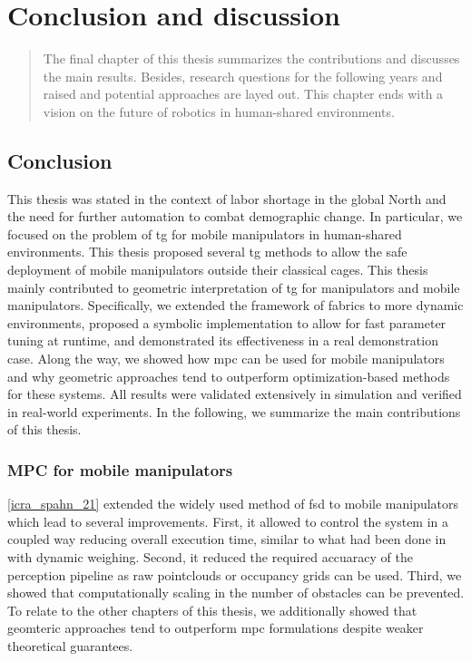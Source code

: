 \chapter{Conclusion and discussion}
\label{cha:conclusion_and_discussion}

\begin{abstract}
The final chapter of this thesis summarizes the contributions and discusses the
main results. Besides, research questions for the following years and raised and
potential approaches are layed out. This chapter ends with a vision on the
future of robotics in human-shared environments.
\end{abstract}

\newpage

\section{Conclusion}
\label{sec:conclusion}

This thesis was stated in the context of labor shortage in the global North and
the need for further automation to combat demographic change. In particular, we
focused on the problem of \ac{tg} for mobile manipulators in human-shared
environments. This thesis proposed several \ac{tg} methods to allow the safe
deployment of mobile manipulators outside their classical cages.
This thesis mainly contributed to geometric interpretation of \ac{tg} for
manipulators and mobile manipulators. Specifically, we extended the framework of
\ac{fabrics} to more dynamic environments, proposed a symbolic implementation to
allow for fast parameter tuning at runtime, and demonstrated its effectiveness
in a real demonstration case. Along the way, we showed how \ac{mpc} can be used
for mobile manipulators and why geometric approaches tend to outperform
optimization-based methods for these systems. All results were validated
extensively in simulation and verified in real-world experiments. In the
following, we summarize the main contributions of this thesis.

\subsection{MPC for mobile manipulators}
\label{sec:conclusion_mpc}

\cref{icra_spahn_21} extended the widely used method of \ac{fsd} to mobile
manipulators which lead to several improvements. First, it allowed to control
the system in a coupled way reducing overall execution time, similar to what had
been done in \cite{Avanzini2018} with dynamic weighing. Second, it reduced the
required accuaracy of the perception pipeline as raw pointclouds or occupancy
grids can be used. Third, we showed that computationally scaling in the number
of obstacles can be prevented. To relate to the other chapters of this thesis,
we additionally showed that geomteric approaches tend to outperform \ac{mpc}
formulations despite weaker theoretical guarantees.

